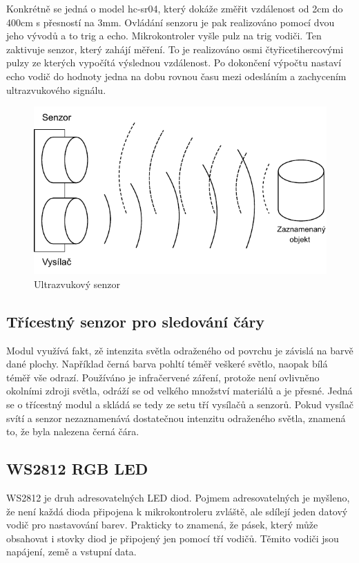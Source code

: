 Konkrétně se jedná o model hc-sr04, který dokáže změřit vzdálenost od 2cm do 400cm s přesností na 3mm. Ovládání senzoru je pak realizováno pomocí dvou jeho vývodů a to trig a echo. Mikrokontroler vyšle pulz na trig vodiči. Ten zaktivuje senzor, který zahájí měření. To je realizováno osmi čtyřicetihercovými pulzy ze kterých vypočítá výslednou vzdálenost. Po dokončení výpočtu nastaví echo vodič do hodnoty jedna na dobu rovnou času mezi odesláním a zachycením ultrazvukového signálu. \cite{embeded_robotics}

\begin{figure}[h!]
	\centering
	\includegraphics[scale=0.75]{obrazky-figures/ultrasonic.pdf}
	\caption{Ultrazvukový senzor}
	\label{}
\end{figure}

\subsection*{Třícestný senzor pro sledování čáry}
Modul využívá fakt, zě intenzita světla odraženého od povrchu je závislá na barvě dané plochy. Například černá barva pohltí téměř veškeré světlo, naopak bílá téměř vše odrazí. Používáno je infračervené záření, protože není ovlivněno okolními zdroji světla, odráží se od velkého množství materiálů a je přesné. Jedná se o třícestný modul a skládá se tedy ze setu tří vysílačů a senzorů. Pokud vysílač svítí a senzor nezaznamenává dostatečnou intenzitu odraženého světla, znamená to, že byla nalezena černá čára. \cite{embeded_robotics}

\subsection*{WS2812 RGB LED}
WS2812 je druh adresovatelných LED diod. Pojmem adresovatelných je myšleno, že není každá dioda připojena k mikrokontroleru zvláště, ale sdílejí jeden datový vodič pro nastavování barev. Prakticky to znamená, že pásek, který může obsahovat i stovky diod je připojený jen pomocí tří vodičů. Těmito vodiči jsou napájení, země a vstupní data. \cite{ws2812}

